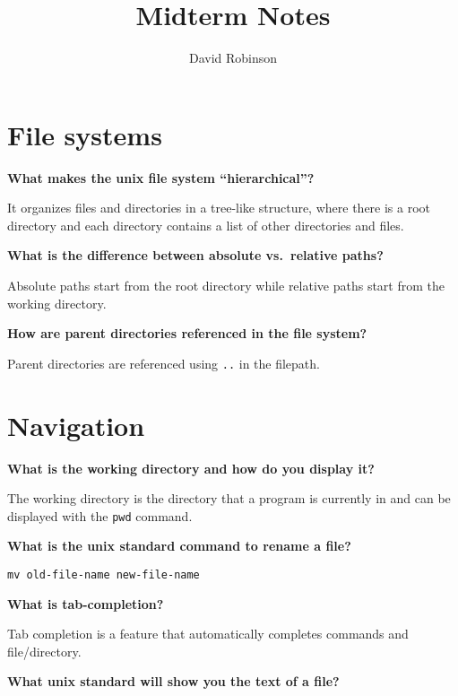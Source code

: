 \documentclass{article}
\title{Midterm Notes}
\author{David Robinson}
\date{}
\newcommand{\inlinecode}[1]{\colorbox{gray!20}{\texttt{#1}}}
\begin{document}
\maketitle

\section*{File systems}
\textbf{What makes the unix file system ``hierarchical''?}
\vspace{0.5em}

It organizes files and directories in a tree-like structure, where there is a root directory and
each directory contains a list of other directories and files.

\vspace{1em}
\textbf{What is the difference between absolute vs.\ relative paths?}
\vspace{0.5em}

Absolute paths start from the root directory while relative paths start from the working directory.

\vspace{1em}
\textbf{How are parent directories referenced in the file system?}
\vspace{0.5em}

Parent directories are referenced using \inlinecode{..} in the filepath.

\section*{Navigation}
\textbf{What is the working directory and how do you display it?}
\vspace{0.5em}

The working directory is the directory that a program is currently in and can be displayed with the
\inlinecode{pwd} command.

\vspace{1em}
\textbf{What is the unix standard command to rename a file?}

\begin{verbatim}
mv old-file-name new-file-name
\end{verbatim}

\textbf{What is tab-completion?}
\vspace{0.5em}

Tab completion is a feature that automatically completes commands and file/directory.

\vspace{1em}
\textbf{What unix standard will show you the text of a file?}
\end{document}
